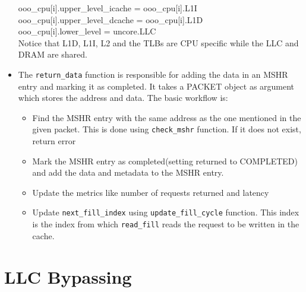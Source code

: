\documentclass[11pt, swedish, openany]{book}
\begin{document}
\begin{itemize}
          ooo\_cpu[i].upper\_level\_icache = ooo\_cpu[i].L1I\\
          ooo\_cpu[i].upper\_level\_dcache = ooo\_cpu[i].L1D\\
          ooo\_cpu[i].lower\_level = uncore.LLC\\
          Notice that L1D, L1I, L2 and the TLBs are CPU specific while the LLC and DRAM are shared.
    \item The \texttt{return\_data} function is responsible for adding the data in an MSHR entry and marking it as completed. It takes a PACKET object as argument which stores the address and data. The basic workflow is:
          \begin{itemize}
              \item Find the MSHR entry with the same address as the one mentioned in the given packet. This is done using \texttt{check\_mshr} function. If it does not exist, return error
              \item Mark the MSHR entry as completed(setting returned to COMPLETED) and add the data and metadata to the MSHR entry.
              \item Update the metrics like number of requests returned and latency
              \item Update \texttt{next\_fill\_index} using \texttt{update\_fill\_cycle} function. This index is the index from which \texttt{read\_fill} reads the request to be written in the cache.
          \end{itemize}
\end{itemize}



\chapter{LLC Bypassing}
\label{LLC Bypassing}
\end{document}
